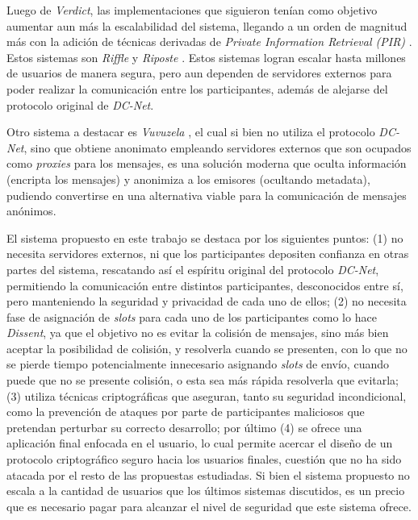 Luego de \emph{Verdict}, las implementaciones que siguieron tenían como objetivo 
aumentar aun más la escalabilidad del sistema, llegando a un orden de magnitud más 
con la adición de técnicas derivadas de \emph{Private Information Retrieval (PIR)} 
\cite{chor1995private}. Estos sistemas son \emph{Riffle} \cite{kwon2016riffle} y 
\emph{Riposte} \cite{corrigan2015riposte}. Estos sistemas logran escalar hasta 
millones de usuarios de manera segura, pero aun dependen de servidores externos 
para poder realizar la comunicación entre los participantes, además de alejarse del 
protocolo original de \emph{DC-Net}.

Otro sistema a destacar es \emph{Vuvuzela} \cite{van2015vuvuzela}, el cual si bien no 
utiliza el protocolo \emph{DC-Net}, sino que obtiene anonimato empleando 
servidores externos que son ocupados como \emph{proxies} para los mensajes, es una 
solución moderna que oculta información (encripta los mensajes) y anonimiza a los 
emisores (ocultando metadata), pudiendo convertirse en una alternativa viable 
para la comunicación de mensajes anónimos.

El sistema propuesto en este trabajo se destaca por los siguientes puntos: (1) no necesita 
servidores externos, ni que los participantes depositen confianza en otras partes del sistema, 
rescatando así el espíritu original del protocolo \emph{DC-Net}, permitiendo la comunicación 
entre distintos participantes, desconocidos entre sí, pero manteniendo la seguridad y privacidad 
de cada uno de ellos; (2) no necesita fase de asignación de \emph{slots} para cada uno 
de los participantes como lo hace \emph{Dissent}, ya que el objetivo no es evitar la 
colisión de mensajes, sino más bien aceptar la posibilidad de colisión, y resolverla 
cuando se presenten, con lo que no se pierde tiempo potencialmente innecesario asignando 
\emph{slots} de envío, cuando puede que no se presente colisión, o esta sea más rápida 
resolverla que evitarla; (3) utiliza técnicas criptográficas que aseguran, tanto su seguridad 
incondicional, como la prevención de ataques por parte de participantes maliciosos 
que pretendan perturbar su correcto desarrollo; por último (4) se ofrece una aplicación 
final enfocada en el usuario, lo cual permite acercar el diseño de un protocolo criptográfico 
seguro hacia los usuarios finales, cuestión que no ha sido atacada por el resto de las propuestas 
estudiadas. Si bien el sistema propuesto no 
escala a la cantidad de usuarios que los últimos sistemas discutidos, es un precio 
que es necesario pagar para alcanzar el nivel de seguridad que este sistema ofrece.